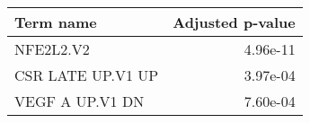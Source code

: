 \begin{tabular}{lr}
\toprule
        Term name &  Adjusted p-value \\
\midrule
        NFE2L2.V2 &          4.96e-11 \\
CSR LATE UP.V1 UP &          3.97e-04 \\
  VEGF A UP.V1 DN &          7.60e-04 \\
\bottomrule
\end{tabular}

